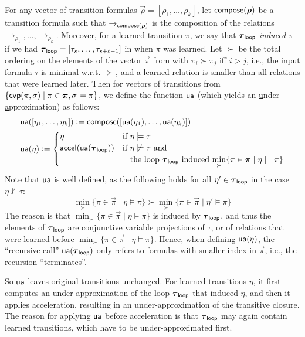 For any vector of transition formulas $\vec{\rho} = [\rho_1,\ldots,\rho_k]$, let ${\mathsf{compose}}(\bm{\mathrm{\rho}})$ be a transition formula such that ${\to_{{\mathsf{compose}}(\bm{\mathrm{\rho}})}}$ is the composition of the relations ${\to_{\rho_1}}, \ldots, {\to_{\rho_k}}$.
%
Moreover, for a learned transition $\pi$, we say that $\bm{\mathrm{\tau}}_{\mathsf{loop}}$ \emph{induced} $\pi$ if we had $\bm{\mathrm{\tau}}_{\mathsf{loop}} = [\tau_s,\ldots,\tau_{s+\ell-1}]$ in  when $\pi$ was learned.
%
Let $\succ$ be the total ordering on the elements of the vector $\vec{\pi}$ from  with $\pi_i \succ \pi_j$ iff $i > j$, i.e., the input formula $\tau$ is minimal w.r.t.\ $\succ$, and a learned relation is smaller than all relations that were learned later.
%
Then for vectors of transitions from $\{\mathsf{cvp}(\pi,\sigma) \mid \pi \in \bm{\mathrm{\pi}}, \sigma \models \pi\}$, we define the function $\mathsf{ua}$ (which yields an \underline{u}nder-\underline{a}pproximation) as follows:
\begin{align*}
  &\underapprox([\eta_1,\ldots,\eta_k]) \Def \compose([\underapprox(\eta_1),\ldots,\underapprox(\eta_k)])\\
  &\underapprox(\eta) \Def
  \begin{cases}
    \eta & \text{if } \eta \models \tau \\
    \accel(\underapprox(\vec{\tau}_\Loop)) & \text{if } \eta \not\models \tau \text{ and}\\
& \phantom{\text{if }} \text{the loop } \vec{\tau}_\Loop \text{ induced }  \underset{\succ}{\min}\{\pi \in \vec{\pi} \mid \eta \models \pi\}
  \end{cases}
\end{align*}
%
Note that $\mathsf{ua}$ is well defined,
 as the following holds for all $\eta' \in \bm{\mathrm{\tau}}_{\mathsf{loop}}$ in the case $\eta \not\models
 \tau$:
\[
  \min_\succ\{\pi \in \vec{\pi} \mid \eta \models \pi\} \succ \min_\succ\{\pi \in \vec{\pi} \mid \eta' \models \pi\}
\]
%
The reason is that
 $\min_\succ\{\pi \in \vec{\pi} \mid \eta \models \pi\}$
is induced by $\bm{\mathrm{\tau}}_{\mathsf{loop}}$, and thus the elements of $\bm{\mathrm{\tau}}_{\mathsf{loop}}$ are
conjunctive variable projections of $\tau$, or of relations that were learned before
$\min_\succ\{\pi \in \vec{\pi} \mid \eta \models \pi\}$.
Hence, when defining $\mathsf{ua}(\eta)$, the ``recursive call''
$\mathsf{ua}(\bm{\mathrm{\tau}}_{\mathsf{loop}})$ only refers to formulas with smaller index in $\vec{\pi}$, i.e., the
recursion ``terminates''.



So $\mathsf{ua}$ leaves original transitions unchanged.
%
For learned transitions
$\eta$, it first
computes an under-approximation
of the loop $\bm{\mathrm{\tau}}_{\mathsf{loop}}$ that induced $\eta$, and then it applies acceleration,
resulting in an under-approximation of the transitive closure.
%
The reason for applying $\mathsf{ua}$ before acceleration is that $\bm{\mathrm{\tau}}_{\mathsf{loop}}$ may again contain learned transitions, which have to be under-approximated first.

